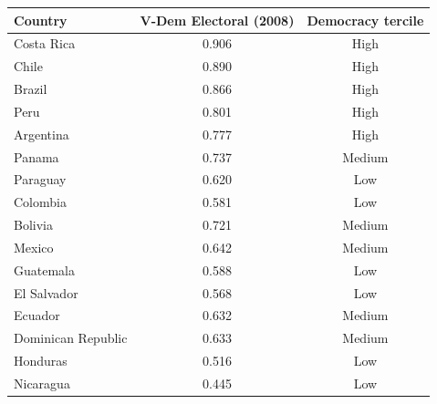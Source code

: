 \begin{tabular}{lcc}
\toprule
Country & V-Dem Electoral (2008) & Democracy tercile \\
\midrule
Costa Rica & 0.906 & High \\
Chile & 0.890 & High \\
Brazil & 0.866 & High \\
Peru & 0.801 & High \\
Argentina & 0.777 & High \\
Panama & 0.737 & Medium \\
Paraguay & 0.620 & Low \\
Colombia & 0.581 & Low \\
Bolivia & 0.721 & Medium \\
Mexico & 0.642 & Medium \\
Guatemala & 0.588 & Low \\
El Salvador & 0.568 & Low \\
Ecuador & 0.632 & Medium \\
Dominican Republic & 0.633 & Medium \\
Honduras & 0.516 & Low \\
Nicaragua & 0.445 & Low \\
\bottomrule
\end{tabular}
